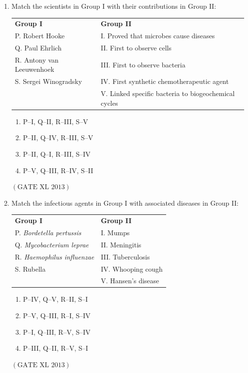 \documentclass[12pt]{article}
\theoremstyle{remark}
\providecommand{\brak}[1]{\ensuremath{\left(#1\right)}}
\begin{document}
\begin{enumerate}
\item Match the scientists in Group I with their contributions in Group II:  
\begin{tabular}{ll}
\textbf{Group I} & \textbf{Group II} \\
P. Robert Hooke & I. Proved that microbes cause diseases \\
Q. Paul Ehrlich & II. First to observe cells \\
R. Antony van Leeuwenhoek & III. First to observe bacteria \\
S. Sergei Winogradsky & IV. First synthetic chemotherapeutic agent \\
& V. Linked specific bacteria to biogeochemical cycles \\
\end{tabular}
\begin{enumerate}
\item P–I, Q–II, R–III, S–V
\item P–II, Q–IV, R–III, S–V
\item P–II, Q–I, R–III, S–IV
\item P–V, Q–III, R–IV, S–II
\end{enumerate}
\hfill $\brak{\text{GATE XL 2013}}$

\item Match the infectious agents in Group I with associated diseases in Group II:  
\begin{tabular}{ll}
\textbf{Group I} & \textbf{Group II} \\
P. \textit{Bordetella pertussis} & I. Mumps \\
Q. \textit{Mycobacterium leprae} & II. Meningitis \\
R. \textit{Haemophilus influenzae} & III. Tuberculosis \\
S. Rubella & IV. Whooping cough \\
& V. Hansen’s disease \\
\end{tabular}
\begin{enumerate}
\item P–IV, Q–V, R–II, S–I
\item P–V, Q–III, R–I, S–IV
\item P–I, Q–III, R–V, S–IV
\item P–III, Q–II, R–V, S–I
\end{enumerate}
\hfill $\brak{\text{GATE XL 2013}}$


\end{enumerate}
\end{document}

